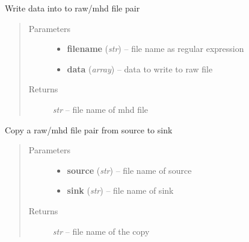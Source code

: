 \documentclass[letterpaper,10pt,english]{sphinxmanual}
\begin{document}

\begin{fulllineitems}
\label{api/ClearMap.IO:ClearMap.IO.RAW.writeData}
Write  data into to raw/mhd file pair
\begin{quote}\begin{description}
\item[{Parameters}] \leavevmode\begin{itemize}
\item {} 
\textbf{filename} (\emph{str}) --
file name as regular expression

\item {} 
\textbf{data} (\emph{array}) --
data to write to raw file

\end{itemize}

\item[{Returns}] \leavevmode
\emph{str} --
file name of mhd file

\end{description}\end{quote}

\end{fulllineitems}


\begin{fulllineitems}
\label{api/ClearMap.IO:ClearMap.IO.RAW.copyData}
Copy a raw/mhd file pair from source to sink
\begin{quote}\begin{description}
\item[{Parameters}] \leavevmode\begin{itemize}
\item {} 
\textbf{source} (\emph{str}) --
file name of source

\item {} 
\textbf{sink} (\emph{str}) --
file name of sink

\end{itemize}

\item[{Returns}] \leavevmode
\emph{str} --
file name of the copy

\end{description}\end{quote}

\end{fulllineitems}
\end{document}

